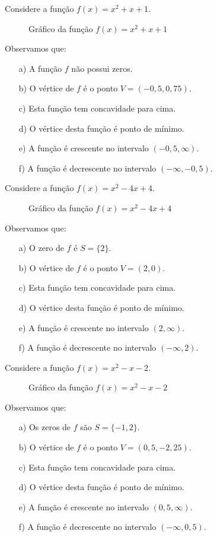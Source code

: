  \begin{exem}
 Considere a função $f(x)= x^2+x+1$.
   \begin{figure}[H]
  \centering
   \caption{Gráfico da função $f(x)= x^2+x+1$}
  \end{figure}
 Observamos que:
 \begin{enumerate}
\item [a)] A função $f$ não possui zeros.
\item [b)] O vértice de $f$ é o ponto $V= (-0,5, 0,75)$.
\item [c)] Esta função tem concavidade para cima.
\item [d)] O vértice desta função é ponto de mínimo.
\item [e)] A função é crescente no intervalo $(-0,5, \infty)$.
\item [f)] A função é decrescente no intervalo $(- \infty, -0,5)$.
\end{enumerate}
 \end{exem}
 
  \begin{exem}
 Considere a função $f(x)= x^2-4x+4$.
   \begin{figure}[H]
  \centering
   \caption{Gráfico da função $f(x)= x^2-4x+4$}
  \end{figure}
 Observamos que:
 \begin{enumerate}
\item [a)] O zero de $f$ é $S= \{2\}$.
\item [b)] O vértice de $f$ é o ponto $V= (2, 0)$.
\item [c)] Esta função tem concavidade para cima.
\item [d)] O vértice desta função é ponto de mínimo.
\item [e)] A função é crescente no intervalo $(2, \infty)$.
\item [f)] A função é decrescente no intervalo $(- \infty, 2)$.
\end{enumerate}
 \end{exem}
 
\begin{exem}
 Considere a função $f(x)= x^2-x-2$.
   \begin{figure}[H]
  \centering
   \caption{Gráfico da função $f(x)= x^2-x-2$}
  \end{figure}
 Observamos que:
 \begin{enumerate}
\item [a)] Os zeros de $f$ são $S= \{-1, 2\}$.
\item [b)] O vértice de $f$ é o ponto $V= (0,5, -2,25)$.
\item [c)] Esta função tem concavidade para cima.
\item [d)] O vértice desta função é ponto de mínimo.
\item [e)] A função é crescente no intervalo $(0,5, \infty)$.
\item [f)] A função é decrescente no intervalo $(- \infty, 0,5)$.
\end{enumerate}
\end{exem}


